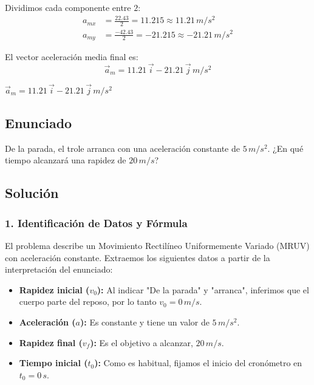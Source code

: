 \documentclass[12pt, a4paper]{article}
\begin{document}
Dividimos cada componente entre $2$:
\begin{align*}
    a_{mx} &= \frac{22.43}{2} = 11.215 \approx 11.21 \, \si{m/s^2} \\
    a_{my} &= \frac{-42.43}{2} = -21.215 \approx -21.21 \, \si{m/s^2}
\end{align*}

El vector aceleración media final es:
$$\vec{a}_m = 11.21 \, \vec{i} - 21.21 \, \vec{j} \, \si{m/s^2}$$

\begin{tcolorbox}[colback=green!5!white, colframe=green!50!black, title=Respuesta Final]
\centering \Large $\vec{a}_m = 11.21 \, \vec{i} - 21.21 \, \vec{j} \, \si{m/s^2}$
\end{tcolorbox}

\newpage

\subsection*{Enunciado}
De la parada, el trole arranca con una aceleración constante de $5 \, \si{m/s^2}$. ¿En qué tiempo alcanzará una rapidez de $20 \, \si{m/s}$?


\subsection*{Solución}

\subsubsection*{1. Identificación de Datos y Fórmula}
El problema describe un Movimiento Rectilíneo Uniformemente Variado (MRUV) con aceleración constante. Extraemos los siguientes datos a partir de la interpretación del enunciado:
\begin{itemize}
    \item \textbf{Rapidez inicial ($v_0$):} Al indicar "De la parada" y "arranca", inferimos que el cuerpo parte del reposo, por lo tanto $v_0 = 0 \, \si{m/s}$.
    \item \textbf{Aceleración ($a$):} Es constante y tiene un valor de $5 \, \si{m/s^2}$.
    \item \textbf{Rapidez final ($v_f$):} Es el objetivo a alcanzar, $20 \, \si{m/s}$.
    \item \textbf{Tiempo inicial ($t_0$):} Como es habitual, fijamos el inicio del cronómetro en $t_0 = 0 \, \si{s}$.
\end{itemize}
\end{document}
